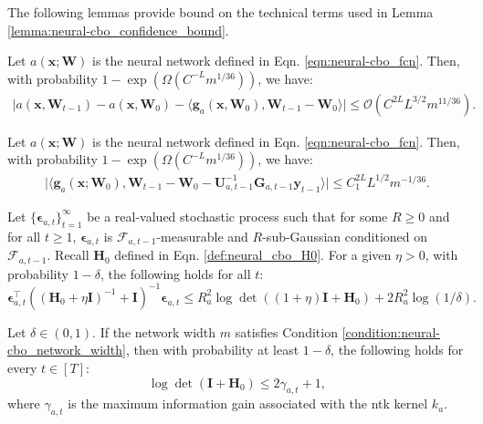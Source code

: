 The following lemmas provide bound on the technical terms used in Lemma \ref{lemma:neural-cbo_confidence_bound}.

\begin{auxlemma} Let $a(\mathbf{x}; \mathbf{W})$ is the neural network defined in Eqn. \eqref{eqn:neural-cbo_fcn}. Then, with probability $1 - \exp (\Omega(C^{-L} m^{1/36}))$, we have: 
\label{lemma:neural_cbo_network_output_vs_lin_approx}
    \begin{align*}
        \lvert a(\mathbf{x}, \mathbf{W}_{t-1}) - a(\mathbf{x}, \mathbf{W}_{0}) - \langle \mathbf{g}_{a}(\mathbf{x}, \mathbf{W}_0), \mathbf{W}_{t-1} - \mathbf{W}_0 \rangle \rvert \le \mathcal{O}(C^{2L} L^{3/2} m^{11/36}).
    \end{align*}
\end{auxlemma}



\begin{auxlemma} Let $a(\mathbf{x}; \mathbf{W})$ is the neural network defined in Eqn. \eqref{eqn:neural-cbo_fcn}. Then, with probability $1 - \exp (\Omega(C^{-L} m^{1/36}))$, we have: 
\label{lemma:neural_cbo_lin_approx_vs_theoretical_regression_sol}
    \begin{align*}
    \lvert \langle \mathbf{g}_a(\mathbf{x};\mathbf{W}_0), \mathbf{W}_{t-1} - \mathbf{W}_0 - \mathbf{U}_{a,t-1}^{-1} \mathbf{G}_{a,t-1} \mathbf{y}_{t-1} \rangle \rvert \le C_1^{2L} L^{1/2} m^{-1/36}.
    \end{align*}
\end{auxlemma}



\begin{auxlemma}
\label{lemma:neural_cbo_noise_affeted_bound}

Let $\{\boldsymbol{\epsilon}_{a, t}\}_{t=1}^\infty$ be a real-valued stochastic process such that for some $R \geq 0$ and for all $t \geq 1$, $\boldsymbol{\epsilon}_{a, t}$ is $\mathcal{F}_{a, t-1}$-measurable and $R$-sub-Gaussian
conditioned on $\mathcal{F}_{a, t-1}$. Recall $\mathbf{H}_{0}$ defined in Eqn.  \eqref{def:neural_cbo_H0}. For a given
$\eta > 0$, with probability $1 - \delta$, the following holds for all $t$:
\[
\boldsymbol{\epsilon}_{a, t}^\top ((\mathbf{H}_0 + \eta\mathbf{I})^{-1}+\mathbf{I})^{-1} \boldsymbol{\epsilon}_{a, t}
\leq R_a^2 \log \det ((1+\eta)\mathbf{I} + \mathbf{H}_0) + 2R_a^2 \log(1/\delta).
\]
\end{auxlemma}

\begin{auxlemma}
\label{lemma:neural_cbo_log_det_Kt_bound}
Let $\delta \in (0,1)$. If the network width $m$ satisfies  Condition \ref{condition:neural-cbo_network_width}, then with probability at least $1-\delta$, the following holds for every $t \in [T]$:
\[ \log \det (\mathbf{I} + \mathbf{H}_0) \le 2\gamma_{a,t} + 1,\]
where $\gamma_{a,t}$ is the maximum information gain associated with the \ac{ntk} kernel $k_a$.
\end{auxlemma}


